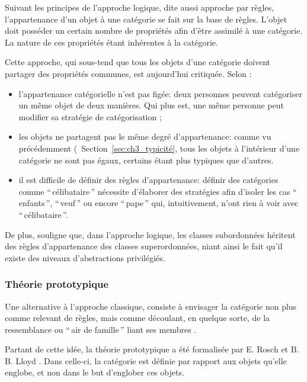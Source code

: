 Suivant les principes de l'approche logique, dite aussi approche par règles, l'appartenance d'un objet à une catégorie se fait sur la base de règles. L'objet doit posséder un certain nombre de propriétés afin d'être assimilé à une catégorie. La nature de ces propriétés étant inhérentes à la catégorie.

Cette approche, qui sous-tend que tous les objets d'une catégorie doivent partager des propriétés communes, est aujourd'hui critiquée. Selon \citep{goldstone2003concepts}:

\begin{itemize}
\item l'appartenance catégorielle n'est pas figée: deux personnes peuvent catégoriser un même objet de deux manières. Qui plus est, une même personne peut modifier sa stratégie de catégorisation \citep{mccloskey1978natural};
\item les objets ne partagent pas le même degré d'appartenance: comme vu précédemment (\cf~Section~\ref{sec:ch3_typicité}, tous les objets à l'intérieur d'une catégorie ne sont pas égaux, certains étant plus typiques que d'autres.
\item il est difficile de définir des règles d'appartenance: définir des catégories comme ``\,célibataire\,'' nécessite d'élaborer des stratégies afin d'isoler les cas ``\,enfants\,'', ``\,veuf\,'' ou encore ``\,pape\,'' qui, intuitivement, n'ont rien à voir avec ``\,célibataire\,''. 
\end{itemize}

De plus, \citep[49]{Houix03f} souligne que, dans l'approche logique, les classes subordonnées héritent des règles d'appartenance des classes superordonnées, niant ainsi le fait qu'il existe des niveaux d'abstractions privilégiés. 

\subsubsection{Théorie prototypique}

Une alternative à l'approche classique, consiste à envisager la catégorie non plus comme relevant de règles, mais comme découlant, en quelque sorte, de la ressemblance ou ``\,air de famille\,'' liant ses membres \citep{ludwig1953philosophical}.

Partant de cette idée, la théorie prototypique a été formalisée par E. Rosch et B. B. Lloyd \citep{rosch1978cognition}. Dans celle-ci, la catégorie est définie par rapport aux objets qu'elle englobe, et non dans le but d'englober ces objets.


